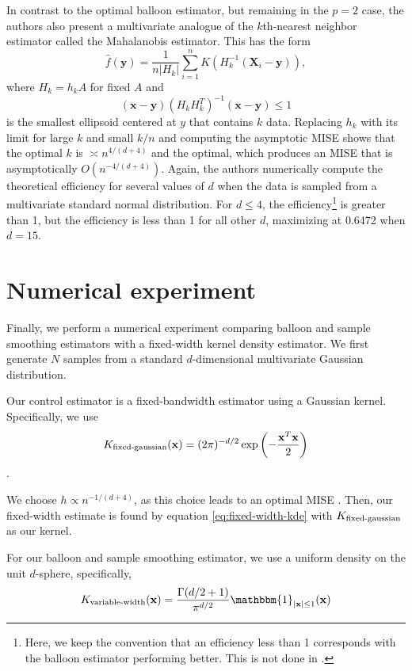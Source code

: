 \documentclass{article}
\newcommand{\abs}[1]{\left|#1\right|}
\begin{document}
In contrast to the optimal balloon estimator, but remaining in the $p=2$ case, the authors also present a multivariate analogue of the $k$th-nearest neighbor estimator called the Mahalanobis estimator. This has the form
\begin{equation}
    \hat{f}(\mathbf{y}) = \frac{1}{n \abs{H_k}} \sum_{i=1}^n K\left(H_k^{-1}(\mathbf{X}_i-\mathbf{y})\right), 
\end{equation}
where $H_k = h_kA$ for fixed $A$ and 
\begin{equation}
    (\mathbf{x}-\mathbf{y})(H_kH_k^T)^{-1}(\mathbf{x}-\mathbf{y}) \leq 1
\end{equation}
is the smallest ellipsoid centered at $y$ that contains $k$ data. Replacing $h_k$ with its limit for large $k$ and small $k/n$ and computing the asymptotic MISE shows that the optimal $k$ is $\asymp n^{4/(d+4)}$ and the optimal, which produces an MISE that is asymptotically $O(n^{-4/(d+4)})$. Again, the authors numerically compute the theoretical efficiency for several values of $d$ when the data is sampled from a multivariate standard normal distribution. For $d \leq 4$, the efficiency\footnote{Here, we keep the convention that an efficiency less than 1 corresponds with the balloon estimator performing better. This is not done in \cite{vkde}.} is greater than 1, but the efficiency is less than 1 for all other $d$, maximizing at 0.6472 when $d=15$.

\section{Numerical experiment}

Finally, we perform a numerical experiment comparing balloon and sample smoothing estimators with a fixed-width kernel density estimator. We first generate $N$ samples from a standard $d$-dimensional multivariate Gaussian distribution.

Our control estimator is a fixed-bandwidth estimator using a Gaussian kernel. Specifically, we use
\begin{equation}
    K_\textup{fixed-gaussian}(\mathbf{x}) = (2\pi)^{-d/2}\exp\left(-\frac{\mathbf{x}^T\mathbf{x}}{2}\right)
\end{equation}.

We choose $h \propto n^{-1/(d+4)}$, as this choice leads to an optimal MISE \cite{jnw}. Then, our fixed-width estimate is found by equation \eqref{eq:fixed-width-kde} with $K_\textup{fixed-gaussian}$ as our kernel.

For our balloon and sample smoothing estimator, we use a uniform density on the unit $d$-sphere, specifically,
\begin{equation}
    K_{\textup{variable-width}}(\mathbf{x}) = \frac{\Gamma(d/2+1)}{\pi^{d/2}}\mathbbm{1}_{\vert\mathbf{x}\vert\leq1}(\mathbf{x})
\end{equation}
\end{document}

